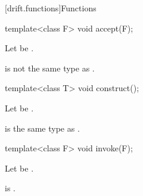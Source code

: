[drift.functions]{Functions}

%
\begin{itemdecl}
template<class F>
  void accept(F);
\end{itemdecl}

\begin{itemdescr}
\pnum
Let  be .

\pnum
\constraints
{} is not the same type as .
\end{itemdescr}

%
\begin{itemdecl}
template<class T>
  void construct();
\end{itemdecl}

\begin{itemdescr}
\pnum
Let  be .

\pnum
\mandates
{} is the same type as .
\end{itemdescr}

%
\begin{itemdecl}
template<class F>
  void invoke(F);
\end{itemdecl}

\begin{itemdescr}
\pnum
Let  be .

\pnum
\constraints
{} is .
\end{itemdescr}

